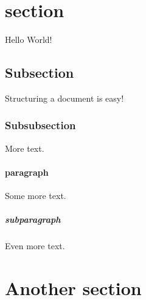\documentclass{article}
\begin{document}
	\section{section}
	Hello World!
	\subsection{Subsection}
	Structuring a document is easy!
	\subsubsection{Subsubsection}
	More text.
	\paragraph{paragraph}
	Some more text.
	\subparagraph{subparagraph}
	Even more text.
	\section{Another section}
\end{document}
